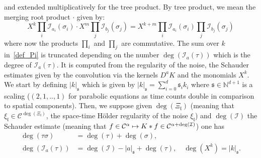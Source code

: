 \documentclass[AHL,Unicode,longabstracts]{cedram}
\newcommand*\I{\mathcal{I}}
\newcommand*\CI{\I}
\newcommand{\cC}{\mathcal{C}}
\newcommand{\mfl}{\mathfrak{l}}
\newcommand*\s{\mathfrak{s}}
\newcommand{\bbN}{\mathbb{N}}
\let\oldmapsto\mapsto
\renewcommand*{\mapsto}{\mathchoice{\longmapsto}{\oldmapsto}{\oldmapsto}{\oldmapsto}}
\begin{document}
and extended multiplicatively for the tree product. By tree product, we mean the merging root product $ \cdot $ given by:
\begin{equation*}
X^k\prod_{i} \CI_{a_i}(\sigma_i) \cdot X^m\prod_{j} \CI_{b_j}(\sigma_j) = X^{k+m} \prod_{i} \CI_{a_i}(\sigma_i) \prod_{j} \CI_{b_j}(\sigma_j)
\end{equation*}
where now the products $ \prod_i $ and $ \prod_j $ are commutative. The sum over $k$ in~\eqref{def_Pi} is truncated depending on the number $ \deg(\CI_{a}(\tau)) $ which is the degree of $ \CI_{a}(\tau)$. It is computed from the regularity of the noise, the Schauder estimates given by the convolution via the kernels $ D^a K $ and the monomials $ X^k $. We start by defining $ |k|_{\s} $ which is given by $ |k|_{\s} = \sum_{i=0}^d \s_i k_i $ where $ \s \in \bbN^{d+1} $ is a scaling ($(2,1,..,1)$ for parabolic equations as time counts double in comparison to spatial components). Then, we suppose given $\deg(\Xi_{\mfl})$ (meaning that $\xi_{\mfl} \in \cC^{\deg(\Xi_{\mfl})}$, the space-time H\"older regularity of the noise $ \xi_{\mfl} $) and $ \deg(\CI) $ the Schauder estimate (meaning that $f \in \cC^{\alpha} \mapsto K * f \in \cC^{\alpha + \deg(\CI)}$) one has
\begin{equation*}
\begin{aligned}
\deg(\tau \sigma) & = \deg(\tau) + \deg(\sigma),
\\
\deg(\CI_a(\tau)) & = \deg(\CI) - |a|_{\s} + \deg(\tau), \quad \deg(X^k) = |k|_{\s}.
\end{aligned}
\end{equation*}
\end{document}

